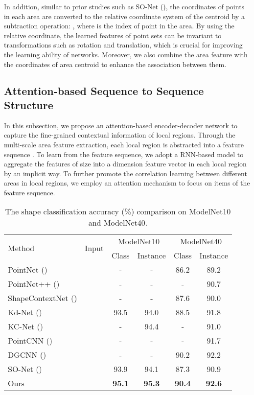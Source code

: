 \documentclass[letterpaper]{article}
\begin{document}
In addition, similar to prior studies such as SO-Net (\citealt{li2018so}), the coordinates of points in each area  are converted to the relative coordinate system of the centroid  by a subtraction operation: , where  is the index of point in the area.
By using the relative coordinate, the learned features of point sets can be invariant to transformations such as rotation and translation, which is crucial for improving the learning ability of networks.
Moreover, we also combine the area feature  with the coordinates of area centroid  to enhance the association between them.

\subsection{Attention-based Sequence to Sequence Structure}
In this subsection, we propose an attention-based encoder-decoder network to capture the fine-grained contextual information of local regions.
Through the multi-scale area feature extraction, each local region  is abstracted into a feature sequence . 
To learn from the feature sequence, we adopt a RNN-based model to aggregate the features  of size  into a  dimension feature vector  in each local region by an implicit way. 
To further promote the correlation learning between different areas in local regions, we employ an attention mechanism to focus on items of the feature sequence.
\begin{table*}[htp]
\centering
\caption{The shape classification accuracy (\%) comparison on ModelNet10 and ModelNet40.}
\label{table:compare}
\begin{tabular}{l|c|cc|cc}
\hline 
\multirow{2}{*}{Method}&
\multicolumn{1}{c|}{\multirow{2}{*}{Input}} & 
	\multicolumn{2}{c|}{ModelNet10} &
	\multicolumn{2}{c}{ModelNet40} \\ 
& \multicolumn{1}{c|}{}
    & \multicolumn{1}{c}{Class}
    & \multicolumn{1}{c|}{Instance}
    & \multicolumn{1}{c}{Class}
    & \multicolumn{1}{c}{Instance} \\ \hline
 PointNet (\citealt{qi2017pointnet})    				          & &-     &-    &86.2 &89.2 \\ 
 PointNet++ (\citealt{qi2017pointnet++})				          & &-     &-    &-    &90.7 \\ 
 ShapeContextNet (\citealt{xie2018attentional})					  & &-		&-	  &87.6	&90.0 \\
 Kd-Net (\citealt{klokov2017escape})    				          & &93.5  &94.0 &88.5 &91.8 \\ 
KC-Net (\citealt{shen2018mining})  				          &   &-     &94.4 &-    &91.0 \\ 
 PointCNN (\citealt{li2018pointcnn})    				        &   &-     &-    &-    &91.7 \\ 
 DGCNN (\citealt{wang2018dynamic})      			         &   &-     &-    &90.2 &92.2 \\
SO-Net (\citealt{li2018so})            				          &   &93.9  &94.1 &87.3 &90.9 \\ \hline
 Ours                               				          &   &\textbf{95.1}  &\textbf{95.3} &\textbf{90.4} &\textbf{92.6} \\
\hline\end{tabular}
\end{table*}
\end{document}
